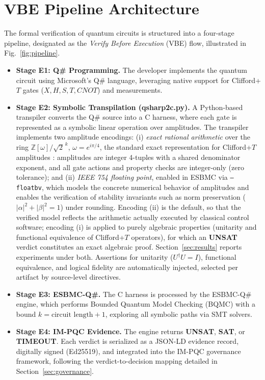 \documentclass[journal]{IEEEtran} %
\begin{document}
\section{VBE Pipeline Architecture}
The formal verification of quantum circuits is structured into a four-stage pipeline, designated as the \textit{Verify Before Execution} (VBE) flow, illustrated in Fig.~\ref{fig:pipeline}.

\begin{itemize}
    \item \textbf{Stage E1: Q\# Programming.} The developer implements the quantum circuit using Microsoft's Q\# language, leveraging native support for Clifford+$T$ gates ($X, H, S, T, CNOT$) and measurements.
    \item \textbf{Stage E2: Symbolic Transpilation (qsharp2c.py).} A Python-based transpiler converts the Q\# source into a C harness, where each gate is represented as a symbolic linear operation over amplitudes. The transpiler implements two amplitude encodings: (i) \textit{exact rational arithmetic} over the ring $\mathbb{Z}[\omega]/\sqrt{2}^{\,k}$, $\omega = e^{i\pi/4}$, the standard exact representation for Clifford+$T$ amplitudes \cite{ref26}: amplitudes are integer 4-tuples with a shared denominator exponent, and all gate actions and property checks are integer-only (zero tolerance); and (ii) \textit{IEEE 754 floating point}, enabled in ESBMC via \texttt{--floatbv}, which models the concrete numerical behavior of amplitudes and enables the verification of stability invariants such as norm preservation ($|\alpha|^2 + |\beta|^2 = 1$) under rounding. Encoding (ii) is the default, so that the verified model reflects the arithmetic actually executed by classical control software; encoding (i) is applied to purely algebraic properties (unitarity and functional equivalence of Clifford+$T$ operators), for which an \textbf{UNSAT} verdict constitutes an exact algebraic proof. Section~\ref{sec:results} reports experiments under both. Assertions for unitarity ($U^\dagger U = I$), functional equivalence, and logical fidelity are automatically injected, selected per artifact by source-level directives.
    \item \textbf{Stage E3: ESBMC-Q\#.} The C harness is processed by the ESBMC-Q\# engine, which performs Bounded Quantum Model Checking (BQMC) with a bound $k = \text{circuit length} + 1$, exploring all symbolic paths via SMT solvers.
    \item \textbf{Stage E4: IM-PQC Evidence.} The engine returns \textbf{UNSAT}, \textbf{SAT}, or \textbf{TIMEOUT}. Each verdict is serialized as a JSON-LD evidence record, digitally signed (Ed25519), and integrated into the IM-PQC governance framework, following the verdict-to-decision mapping detailed in Section~\ref{sec:governance}.
\end{itemize}
\end{document}
